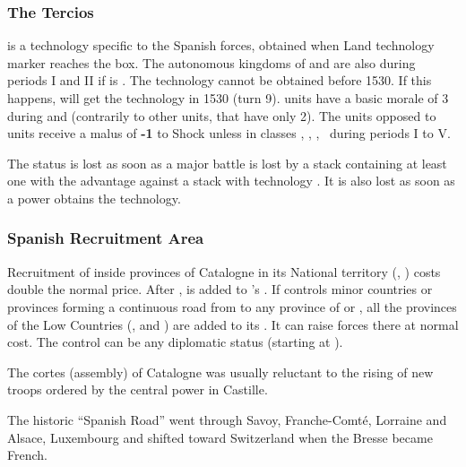 \subsubsection{The Tercios}
\aparag \TTER is a technology specific to the Spanish forces, obtained
when \SPA Land technology marker reaches the \TTER box.
\bparag The autonomous kingdoms of  and  are
also \TTER during periods I and II if \SPA is \TTER.
\bparag The technology \TTER cannot be obtained before 1530. If this
happens, \SPA will get the \TTER technology in 1530 (turn 9).
\bparag \TTER units have a basic morale of 3 during \TREN and \TARQ
(contrarily to other units, that have only 2).
\bparag The units opposed to \TTER units receive a malus of {\bf -1} to
Shock unless in classes \CAI, \CAIM, \CAII, \CAIIM\ during periods I to
V.

\aparag The \TTER status is lost as soon as a major battle is lost by a
stack containing at least one \ARMY\faceplus with the \TTER advantage
against a stack with technology \TBAR.
\bparag It is also lost as soon as a power obtains the \TMAN technology.


\subsubsection{Spanish Recruitment Area}\label{chSpecific:Spain:Recruitment
  Area}
 Recruitment of \HIS inside provinces of
Catalogne in its National territory (\provinceCatalunya,
\provincePirineos) costs double the normal price.
 After ,
 is added to \SPA's .
 If \SPA controls minor countries or provinces
forming a continuous road from  to any province of
 or , all the provinces of the Low
Countries (\paysProvincesne, \paysHollande and \paysBourgogne) are added
to its . It can raise forces there at normal
cost. The control can be any diplomatic status (starting at \RM).
\begin{histoire}
  The cortes (assembly) of Catalogne was usually reluctant to the rising
  of new troops ordered by the central power in Castille.

  The historic ``Spanish Road'' went through Savoy, Franche-Comt\'e,
  Lorraine and Alsace, Luxembourg and shifted toward Switzerland when
  the Bresse became French.
\end{histoire}


